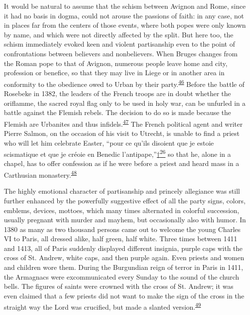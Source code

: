 It would be natural to assume that the schism between Avignon and Rome,
since it had no basis in dogma, could not arouse the passions of faith:
in any case, not in places far from the centers of those events, where
both popes were only known by name, and which were not directly affected
by the split. But here too, the schism immediately evoked keen and
violent partisanship even to the point of confrontations between
believers and nonbelievers. When Bruges changes from the Roman pope to
that of Avignon, numerous people leave home and city, profession or
benefice, so that they may live in Liege or in another area in
conformity to the obedience owed to Urban by their
party.\textsuperscript{\protect\hypertarget{08_Chapter_One__THE_PASSIONATE_INTE.xhtmlux5cux23id_2139}{\protect\hyperlink{23_NOTES.xhtmlux5cux23id_2140}{46}}}
Before the battle of Rosebeke in 1382, the leaders of the French troops
are in doubt whether the oriflamme, the sacred royal flag only to be
used in holy war, can be unfurled in a battle against the Flemish
rebels. The decision to do so is made because the Flemish are Urbanites
and thus
infidels.\textsuperscript{\protect\hypertarget{08_Chapter_One__THE_PASSIONATE_INTE.xhtmlux5cux23id_2137}{\protect\hyperlink{23_NOTES.xhtmlux5cux23id_2138}{47}}}
The French political agent and writer Pierre Salmon, on the occasion of
his visit to Utrecht, is unable to find a priest who will let him
celebrate Easter, ``pour ce qu'ils disoient que je estoie scismatique et
que je créoie en Benedic
l'antipape,''\protect\hypertarget{08_Chapter_One__THE_PASSIONATE_INTE.xhtmlux5cux23id_2385}{\protect\hyperlink{23_NOTES.xhtmlux5cux23id_2386}{†\textsuperscript{26}}}
so that he, alone in a chapel, has to offer confession as if he were
before a priest and heard mass in a Carthusian
monastery.\textsuperscript{\protect\hypertarget{08_Chapter_One__THE_PASSIONATE_INTE.xhtmlux5cux23id_2135}{\protect\hyperlink{23_NOTES.xhtmlux5cux23id_2136}{48}}}

The highly emotional character of partisanship and princely allegiance
was still further enhanced by the powerfully suggestive effect of all
the party signs, colors, emblems, devices, mottoes, which many times
alternated in colorful succession, usually pregnant with murder and
mayhem, but occasionally also with humor. In 1380 as many as two
thousand persons came out to welcome the young Charles VI to Paris, all
dressed alike, half green, half white. Three times between 1411 and
1413, all of Paris suddenly displayed different insignia, purple caps
with the cross of St. Andrew, white caps, and then purple again. Even
priests and women and children wore them. During the Burgundian reign of
terror in Paris in 1411, the Armagnacs were excommunicated every Sunday
to the sound of
\protect\hypertarget{08_Chapter_One__THE_PASSIONATE_INTE.xhtmlux5cux23page_20}{}{}the
church bells. The figures of saints were crowned with the cross of St.
Andrew; it was even claimed that a few priests did not want to make the
sign of the cross in the straight way the Lord was crucified, but made a
slanted
version.\textsuperscript{\protect\hypertarget{08_Chapter_One__THE_PASSIONATE_INTE.xhtmlux5cux23id_2133}{\protect\hyperlink{23_NOTES.xhtmlux5cux23id_2134}{49}}}

